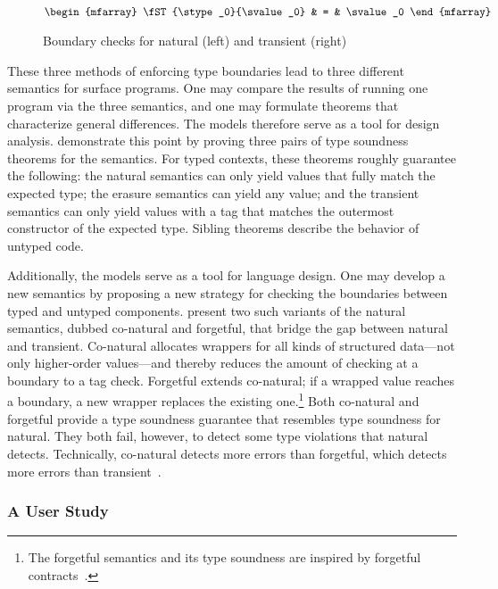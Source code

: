 \begin{figure}[ht]
\begin{minipage}[t]{0.40\columnwidth}
  \fbox{$\STsym : \tpair{\stype}{\svalue} \rightarrow \svalue \cup \serror$}\\
  \(\begin{mfarray}
    \fST{\stype_0}{\svalue_0}
    & = &
    \svalue_0
  \end{mfarray}\)
  \end{minipage}

  \caption{Boundary checks for natural (left) and transient (right)}
  \label{fig:nt-boundary}
\end{figure}

These three methods of enforcing type boundaries lead to three different
 semantics for surface programs.
One may compare the results of running one program via the three semantics,
 and one may formulate theorems that characterize general differences.
The models therefore serve as a tool for design analysis.
\citet{gf-icfp-2018} demonstrate this point by proving three pairs of type
 soundness theorems for the semantics.
For typed contexts, these theorems roughly guarantee the following:
 the natural semantics can only yield values that fully match the expected type;
 the erasure semantics can yield any value;
 and the transient semantics can only yield values with a tag that matches
 the outermost constructor of the expected type.
Sibling theorems describe the behavior of untyped code.

Additionally, the models serve as a tool for language design.
One may develop a new semantics by proposing a new strategy for checking
 the boundaries between typed and untyped components.
\citet{gf-icfp-2018} present two such variants of the natural semantics,
 dubbed co-natural and forgetful,
 that bridge the gap between natural and transient.
Co-natural allocates wrappers for all kinds of structured data---not only
 higher-order values---and thereby reduces the amount of checking at a boundary
 to a tag check.
Forgetful extends co-natural; if a wrapped value reaches a boundary, a new
 wrapper replaces the existing one.\footnote{The forgetful semantics and its
  type soundness are inspired by forgetful contracts~\cite{g-popl-2015}.}
Both co-natural and forgetful provide a type soundness guarantee that resembles
 type soundness for natural.
They both fail, however, to detect some type violations that natural detects.
Technically, co-natural detects more errors than forgetful, which detects
 more errors than transient~\cite{gf-icfp-2018}.


\subsubsection{A User Study}

